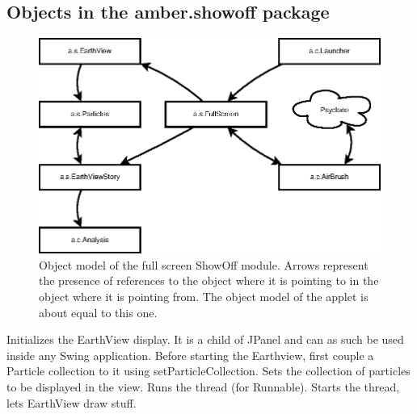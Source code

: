 \subsection{Objects in the amber.showoff package}


\begin{figure}[htp]
  \centering
  \includegraphics{image/showoff-fullscreen}
  \caption{\label{fig:showoff-fullscreen}Object model of the full screen
    ShowOff module. Arrows represent the presence of references to the object
    where it is pointing to in the object where it is pointing from. The object
    model of the applet is about equal to this one.}
\end{figure}



\begin{classmetadata}
\end{classmetadata}

\begin{interface}
    {Initializes the EarthView display. It is a child of JPanel and can as such
    be used inside any Swing application. Before starting the Earthview, first
    couple a Particle collection to it using setParticleCollection.}
    {Sets the collection of particles to be displayed in the view.}
    {Runs the thread (for Runnable).}
    {Starts the thread, lets EarthView draw stuff.}
\end{interface}



